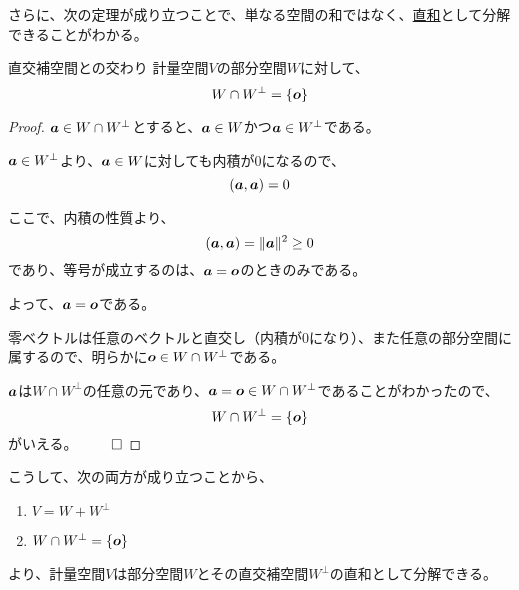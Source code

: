 \documentclass[../../../topic_linear-algebra]{subfiles}
\begin{document}
\br

さらに、次の定理が成り立つことで、単なる空間の和ではなく、\hyperref[def:direct-sum]{直和}として分解できることがわかる。

\begin{theorem*}{直交補空間との交わり}
  計量空間$V$の部分空間$W$に対して、
  \begin{equation*}
    W \cap W^\perp = \{ \vb*{o} \}
  \end{equation*}
\end{theorem*}

\begin{proof}
  $\vb*{a} \in W \cap W^\perp$とすると、$\vb*{a} \in W$かつ$\vb*{a} \in W^\perp$である。

  $\vb*{a} \in W^\perp$より、$\vb*{a} \in W$に対しても内積が0になるので、
  \begin{equation*}
    (\vb*{a}, \vb*{a}) = 0
  \end{equation*}

  ここで、内積の性質より、
  \begin{equation*}
    (\vb*{a}, \vb*{a}) = \| \vb*{a} \|^2 \geq 0
  \end{equation*}
  であり、等号が成立するのは、$\vb*{a} = \vb*{o}$のときのみである。

  よって、$\vb*{a} = \vb*{o}$である。

  \br

  零ベクトルは任意のベクトルと直交し（内積が0になり）、また任意の部分空間に属するので、明らかに$\vb*{o} \in W \cap W^\perp$である。

  \br

  $\vb*{a}$は$W \cap W^\perp$の任意の元であり、$\vb*{a} = \vb*{o} \in W \cap W^\perp$であることがわかったので、
  \begin{equation*}
    W \cap W^\perp = \{ \vb*{o} \}
  \end{equation*}
  がいえる。 $\qed$
\end{proof}

\br

こうして、次の両方が成り立つことから、
\begin{enumerate}[label=\romanlabel]
  \item $V = W + W^\perp$
  \item $W \cap W^\perp = \{ \vb*{o} \}$
\end{enumerate}
より、計量空間$V$は部分空間$W$とその直交補空間$W^\perp$の直和として分解できる。

\br
\end{document}
